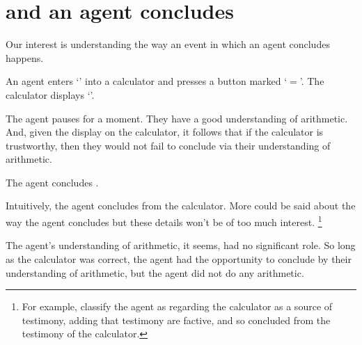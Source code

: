 \chapter{\qWhy{} and \qHow{} an agent concludes}
\label{cha:intro}


\begin{note}
  Our interest is understanding the way an event in which an agent concludes happens.

  \begin{scenario}[Calculation]%
    \label{scen:calc}%
    An agent enters `\gistCalcLHS{}' into a calculator and presses a button marked `\(=\)'.
    The calculator displays `\gistCalcRHS{}'.

    The agent pauses for a moment.
    They have a good understanding of arithmetic.
    And, given the display on the calculator, it follows that if the calculator is trustworthy, then they would not fail to conclude \propM{\gistCalcEq{}} via their understanding of arithmetic.

    The agent concludes \propM{\gistCalcEq{}}.
  \end{scenario}

  \noindent%
  Intuitively, the agent concludes \propM{\gistCalcEq{}} from the calculator.
  More could be said about the way the agent concludes but these details won't be of too much interest.%
  \footnote{
    For example, classify the agent as regarding the calculator as a source of testimony, adding that testimony are factive, and so concluded \propM{\gistCalcEq{}} from the testimony of the calculator.
  }

  The agent's understanding of arithmetic, it seems, had no significant role.
  So long as the calculator was correct, the agent had the opportunity to conclude \propM{\gistCalcEq{}} by their understanding of arithmetic, but the agent did not do any arithmetic.
\end{note}


